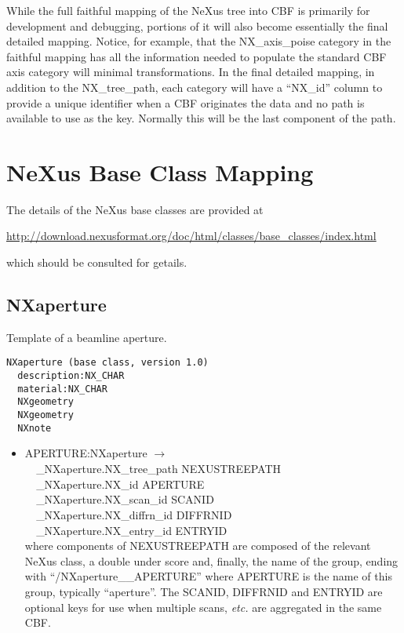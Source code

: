 \documentclass[11pt]{article}
\begin{document}
{{While the full faithful mapping of the NeXus tree into CBF is primarily for development and debugging,
portions of it will also become essentially the final detailed mapping.  Notice, for example,
that the NX\_axis\_poise category in the faithful mapping has all the information needed to
populate the standard CBF axis category will minimal transformations.  In the final
detailed mapping, in addition to the NX\_tree\_path, each category will have a ``NX\_id'' column
to provide a unique identifier when a CBF originates the data and no path is available
to use as the key.  Normally this will be the last component of the path.

\section{NeXus Base Class Mapping}

The details of the NeXus base classes are provided at

\url{http://download.nexusformat.org/doc/html/classes/base_classes/index.html}

which should be consulted for getails.

\subsection{NXaperture}

Template of a beamline aperture.

\begin{verbatim}
NXaperture (base class, version 1.0)
  description:NX_CHAR
  material:NX_CHAR
  NXgeometry
  NXgeometry
  NXnote
\end{verbatim}

\begin{itemize}

\item{APERTURE:NXaperture $\rightarrow$\\
\verb|  |\_NXaperture.NX\_tree\_path    NEXUSTREEPATH \\
\verb|  |\_NXaperture.NX\_id            APERTURE\\
\verb|  |\_NXaperture.NX\_scan\_id      SCANID \\
\verb|  |\_NXaperture.NX\_diffrn\_id    DIFFRNID \\
\verb|  |\_NXaperture.NX\_entry\_id     ENTRYID \\
where components of NEXUSTREEPATH are composed of the
relevant NeXus class, a double under score and, finally, the
name of the group, ending with ``/NXaperture\_\_APERTURE''
where APERTURE is the name of this group, typically ``aperture''.
The SCANID, DIFFRNID and ENTRYID are optional keys for use
when multiple scans, {\it etc.} are aggregated in the same CBF.}


\end{itemize}}}
\end{document}
